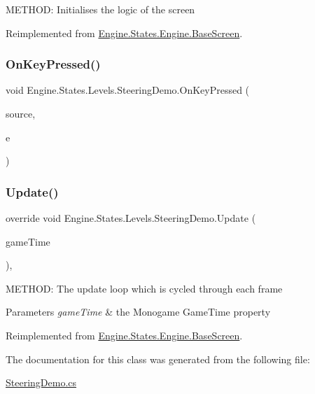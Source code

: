 M\+E\+T\+H\+OD\+: Initialises the logic of the screen 



Reimplemented from \hyperlink{a00550_af8fd6890abf865641e190578ef2e054c}{Engine.\+States.\+Engine.\+Base\+Screen}.

\mbox{\label{a00570_addcf72bee8c2ebbf4a7170c21fb49275}} 
\subsubsection{\texorpdfstring{On\+Key\+Pressed()}{OnKeyPressed()}}
{\footnotesize\ttfamily void Engine.\+States.\+Levels.\+Steering\+Demo.\+On\+Key\+Pressed (\begin{DoxyParamCaption}\item[{object}]{source,  }\item[{\hyperlink{a00362}{Key\+Event\+Args}}]{e }\end{DoxyParamCaption})\hspace{0.3cm}{\ttfamily [inline]}}

\mbox{\label{a00570_a4210cc45e9038a007132fbafde08fa71}} 
\subsubsection{\texorpdfstring{Update()}{Update()}}
{\footnotesize\ttfamily override void Engine.\+States.\+Levels.\+Steering\+Demo.\+Update (\begin{DoxyParamCaption}\item[{Game\+Time}]{game\+Time }\end{DoxyParamCaption})\hspace{0.3cm}{\ttfamily [inline]}, {\ttfamily [virtual]}}



M\+E\+T\+H\+OD\+: The update loop which is cycled through each frame 


\begin{DoxyParams}{Parameters}
{\em game\+Time} & the Monogame Game\+Time property\\
\hline
\end{DoxyParams}


Reimplemented from \hyperlink{a00550_a098ece7d1e112475f6e880c3a672af64}{Engine.\+States.\+Engine.\+Base\+Screen}.



The documentation for this class was generated from the following file\+:\begin{DoxyCompactItemize}
\item 
\hyperlink{a00209}{Steering\+Demo.\+cs}\end{DoxyCompactItemize}
